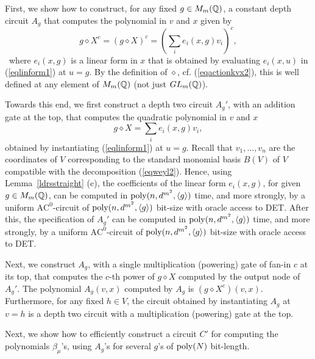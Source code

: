 \documentclass[11pt]{article}
\begin{document}
First,  we show how to construct, for any 
fixed $g \in M_m(\mathbb{Q})$,
a constant depth  circuit $A_g$  that computes the polynomial in $v$ and $x$ given by 
\begin{equation} 
g \diamond  X^c = (g \diamond  X)^c  = (\sum_i  e_i( x, g) v_i)^c,
\end{equation}\
where $e_i( x,g)$ is a linear form in $ x$ that is obtained by evaluating
$e_i( x, u)$ in (\ref{eqlinform1}) at $u=g$. By the definition of $\diamond$, 
cf. (\ref{eqactionkvx2}),
this is well defined at any element of $M_m(\mathbb{Q})$ (not just $GL_m(\mathbb{Q})$). 

Towards this end,  we first construct a depth two circuit $A_g'$, 
with an addition gate at the top,
that computes the quadratic 
polynomial in $v$ and $x$
\begin{equation} 
g \diamond  X = \sum_i  e_i( x, g) v_i,
\end{equation}
obtained by instantiating (\ref{eqlinform1}) at $u=g$. 
Recall that  $v_1,\ldots,v_n$ are the  coordinates of $V$ corresponding to the 
standard monomial basis $B(V)$ of $V$ compatible with the decomposition (\ref{eqweyl2}).
Hence, using Lemma~\ref{ldrsstraight} (c), the coefficients  of the 
linear form $e_i(x,g)$, for given $g \in M_m(\mathbb{Q})$,
can be computed in ${\mbox {poly}}(n,d^{m^2},\langle g \rangle)$ time, and more strongly, by a uniform $\mbox{AC}^0$-circuit of
${\mbox {poly}}(n,d^{m^2},\langle g \rangle)$ bit-size with oracle access to DET.
After this, the specification
of $A_g'$ can  be computed in  ${\mbox {poly}}(n,d^{m^2},\langle g \rangle)$ time, and more strongly, by a uniform 
$\mbox{AC}^0$-circuit of  ${\mbox {poly}}(n,d^{m^2},\langle g \rangle)$ bit-size with oracle access to DET.

Next,  we construct $A_g$, with a single multiplication (powering) gate of fan-in $c$ at its top,
that  computes the $c$-th power of $g \diamond X$ computed by the output node of $A_g'$. 
The polynomial $A_g(v, x)$ computed by $A_g$ is 
$(g \diamond  X^c)(v, x)$. Furthermore, for any fixed $h \in V$,
the circuit obtained by instantiating $A_g$ at $v=h$ is a depth two circuit with a multiplication
(powering) gate at the top. 

Next, we show how to efficiently construct 
a  circuit $C'$  for computing the polynomials $\beta_\mu$'s,
using $A_g$'s for several $g$'s of ${\mbox {poly}}(N)$ bit-length.
\end{document}
